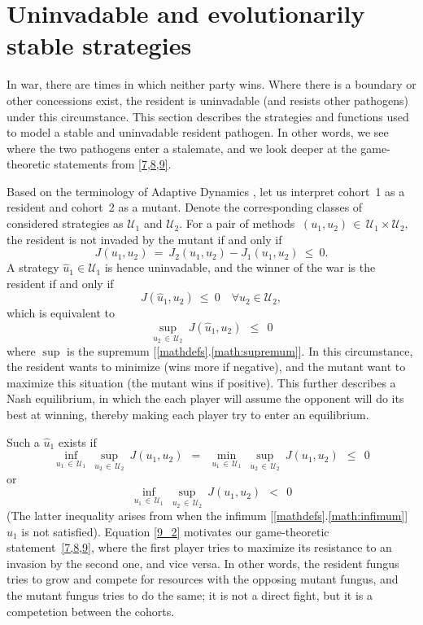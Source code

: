 \documentclass[11pt]{amsart}
\begin{document}
\section{Uninvadable and evolutionarily stable strategies}
In war, there are times in which neither party wins. Where there is a boundary or other concessions exist, the resident is uninvadable (and resists other pathogens) under this circumstance. This section describes the strategies and functions used to model a stable and uninvadable resident pathogen. In other words, we see where the two pathogens enter a stalemate, and we look deeper at the game-theoretic statements from {\rm \cref{7,8,9}}.

Based on the terminology of Adaptive Dynamics \cite{DercoleRinaldi2008}, let
us interpret cohort~{\rm 1} as a resident and cohort~{\rm 2} as a mutant.
Denote the corresponding classes of considered strategies as $ \mathcal{U}_1 $
and $ \mathcal{U}_2 $. For a pair of methods
$ \: (u_1, u_2) \, \in \, \mathcal{U}_1 \times \mathcal{U}_2, \: $
the resident is not invaded by the mutant if and only if
$$
J(u_1, u_2) \: = \: J_2(u_1, u_2) - J_1(u_1, u_2) \: \leqslant \: 0.
$$
A strategy 
$ \hat{u}_1 \in \mathcal{U}_1 $
is hence uninvadable, and the winner of the war is the resident if and only if
$$
J \left( \hat{u}_1, u_2 \right) \: \leqslant \: 0 \quad \forall u_2 \in
  \mathcal{U}_2,
$$
which is equivalent to
$$
\sup_{u_2 \, \in \, \mathcal{U}_2} \: J \left( \hat{u}_1, u_2 \right) \:\:
  \leqslant \:\: 0
$$
where $\sup$ is the supremum [\ref{mathdefs}.\ref{math:supremum}]. In this circumstance, the resident wants to minimize (wins more if negative), and the mutant want to maximize this situation (the mutant wins if positive). This further describes a Nash equilibrium, in which the each player will assume the opponent will do its best at winning, thereby making each player try to enter an equilibrium.


Such a $ \hat{u}_1 $ exists if
\begin{equation}
\inf_{u_1 \, \in \, \mathcal{U}_1} \: \sup_{u_2 \, \in \, \mathcal{U}_2} \:
  J(u_1, u_2) \:\: = \:\:
\min_{u_1 \, \in \, \mathcal{U}_1} \: \sup_{u_2 \, \in \, \mathcal{U}_2} \:
  J(u_1, u_2) \:\: \leqslant \:\: 0  \label{9_2}
\end{equation}
or
\begin{equation}
\inf_{u_1 \, \in \, \mathcal{U}_1} \: \sup_{u_2 \, \in \, \mathcal{U}_2} \:
  J(u_1, u_2) \:\: < \:\: 0  \label{9_4}
\end{equation}
(The latter inequality arises from when the infimum [\ref{mathdefs}.\ref{math:infimum}] $u_1$ is not satisfied).
Equation \cref{9_2} motivates our game-theoretic statement~{\rm \cref{7,8,9},}
where the first player tries to maximize its resistance to an invasion by the
second one{\rm ,} and vice versa. In other words, the resident fungus tries to grow and compete for resources with the opposing mutant fungus, and the mutant fungus tries to do the same; it is not a direct fight, but it is a competetion between the cohorts.
\end{document}
